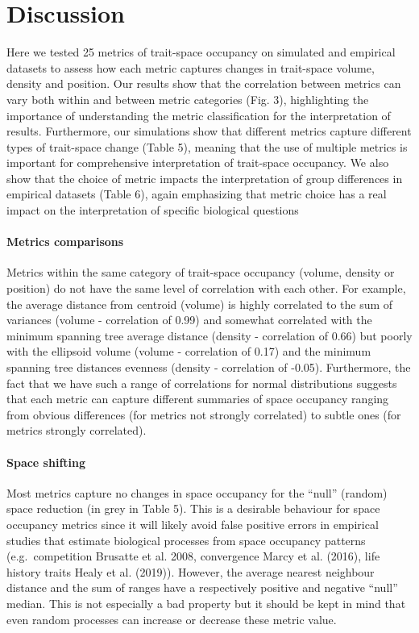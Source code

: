 \documentclass[]{article}
\let\oldparagraph\paragraph
\renewcommand{\paragraph}[1]{\oldparagraph{#1}\mbox{}}
\begin{document}
\section{Discussion}\label{discussion}

Here we tested 25 metrics of trait-space occupancy on simulated and
empirical datasets to assess how each metric captures changes in
trait-space volume, density and position. Our results show that the
correlation between metrics can vary both within and between metric
categories (Fig. 3), highlighting the importance of understanding the
metric classification for the interpretation of results. Furthermore,
our simulations show that different metrics capture different types of
trait-space change (Table 5), meaning that the use of multiple metrics
is important for comprehensive interpretation of trait-space occupancy.
We also show that the choice of metric impacts the interpretation of
group differences in empirical datasets (Table 6), again emphasizing
that metric choice has a real impact on the interpretation of specific
biological questions

\paragraph{Metrics comparisons}\label{metrics-comparisons}

Metrics within the same category of trait-space occupancy (volume,
density or position) do not have the same level of correlation with each
other. For example, the average distance from centroid (volume) is
highly correlated to the sum of variances (volume - correlation of 0.99)
and somewhat correlated with the minimum spanning tree average distance
(density - correlation of 0.66) but poorly with the ellipsoid volume
(volume - correlation of 0.17) and the minimum spanning tree distances
evenness (density - correlation of -0.05). Furthermore, the fact that we
have such a range of correlations for normal distributions suggests that
each metric can capture different summaries of space occupancy ranging
from obvious differences (for metrics not strongly correlated) to subtle
ones (for metrics strongly correlated).

\paragraph{Space shifting}\label{space-shifting-1}

Most metrics capture no changes in space occupancy for the ``null''
(random) space reduction (in grey in Table 5). This is a desirable
behaviour for space occupancy metrics since it will likely avoid false
positive errors in empirical studies that estimate biological processes
from space occupancy patterns (e.g.~competition Brusatte et al. 2008,
convergence Marcy et al. (2016), life history traits Healy et al.
(2019)). However, the average nearest neighbour distance and the sum of
ranges have a respectively positive and negative ``null'' median. This
is not especially a bad property but it should be kept in mind that even
random processes can increase or decrease these metric value.
\end{document}
